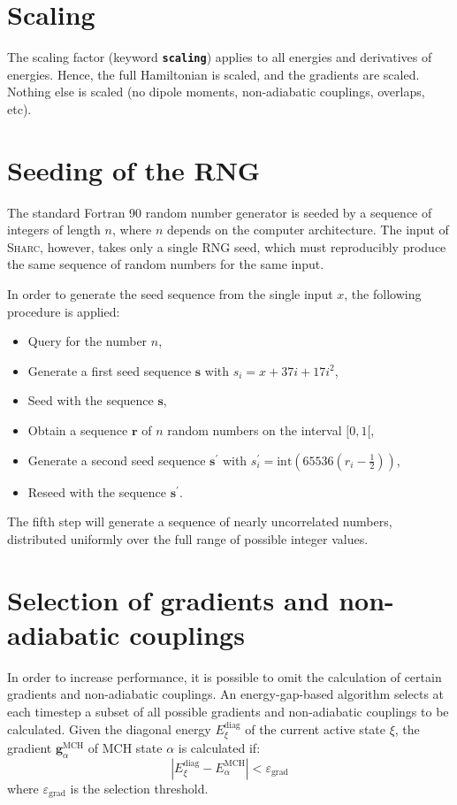 \documentclass[a4paper,11pt,DIV=15,openany,twoside=false]{scrbook}
\newcommand{\sharc}{\textsc{Sharc}}
\newcommand{\ttt}[1]{\textbf{\texttt{#1}}}
\newcommand{\VEC}[1]{\ensuremath{\mathbf{#1}}}
\begin{document}
\section{Scaling}\label{met:scaling}

The scaling factor (keyword \ttt{scaling}) applies to all energies and derivatives of energies. Hence, the full Hamiltonian is scaled, and the gradients are scaled. Nothing else is scaled (no dipole moments, non-adiabatic couplings, overlaps, etc).


\section{Seeding of the RNG}\label{met:seed}

The standard Fortran 90 random number generator is seeded by a sequence of integers of length $n$, where $n$ depends on the computer architecture. The input of \sharc, however, takes only a single RNG seed, which must reproducibly produce the same sequence of random numbers for the same input.

In order to generate the seed sequence from the single input $x$, the following procedure is applied:
\begin{itemize}
  \item Query for the number $n$,
  \item Generate a first seed sequence $\VEC{s}$ with $s_i=x+37i+17i^2$,
  \item Seed with the sequence $\VEC{s}$,
  \item Obtain a sequence $\VEC{r}$ of $n$ random numbers on the interval $[0,1[$,
  \item Generate a second seed sequence $\VEC{s}^\prime$ with $s_i^\prime=\text{int}\left(65536(r_i-\frac{1}{2})\right)$,
  \item Reseed with the sequence $\VEC{s}^\prime$.
\end{itemize}
The fifth step will generate a sequence of nearly uncorrelated numbers, distributed uniformly over the full range of possible integer values. 


\section{Selection of gradients and non-adiabatic couplings}\label{met:selection}

In order to increase performance, it is possible to omit the calculation of certain gradients and non-adiabatic couplings. An energy-gap-based algorithm selects at each timestep a subset of all possible gradients and non-adiabatic couplings to be calculated. Given the diagonal energy $E^{\text{diag}}_\xi$ of the current active state $\xi$, the gradient $\VEC{g}^{\text{MCH}}_\alpha$ of MCH state $\alpha$ is calculated if:
\begin{equation}
  \left|
    E^{\text{diag}}_\xi - E^{\text{MCH}}_\alpha
  \right|
  <
  \varepsilon_\text{grad}
\end{equation}
where $\varepsilon_\text{grad}$ is the selection threshold.
\end{document}
